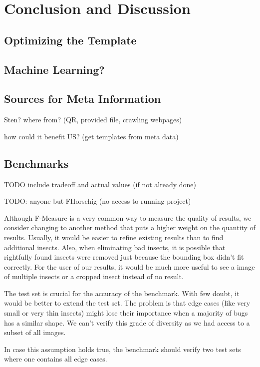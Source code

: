 %
\section{Conclusion and Discussion}
\label{sec_conclusion}

\subsection{Optimizing the Template}
\subsection{Machine Learning?}
\subsection{Sources for Meta Information}
Sten?
where from? (QR, provided file, crawling webpages)

how could it benefit US? (get templates from meta data)

\subsection{Benchmarks}
TODO include tradeoff and actual values (if not already done)

TODO: anyone but FHorschig (no access to running project)



Although F-Measure is a very common way to measure the quality of results, we consider changing  to another method that puts a higher weight on the quantity of results.
Usually, it would be easier to refine existing results than to find additional insects. 
Also, when eliminating bad insects, it is possible that rightfully found insects were removed just because the bounding box didn't fit correctly.
For the user of our results, it would be much more useful to see a image of multiple insects or a cropped insect instead of no result.

The test set is crucial for the accuracy of the benchmark. 
With few doubt, it would be better to extend the test set. 
The problem is that edge cases (like very small or very thin insects) might lose their importance when a majority of bugs has a similar shape.
We can't verify this grade of diversity as we had access to a subset of all images.

In case this assumption holds true, the benchmark should verify two test sets where one contains all edge cases.